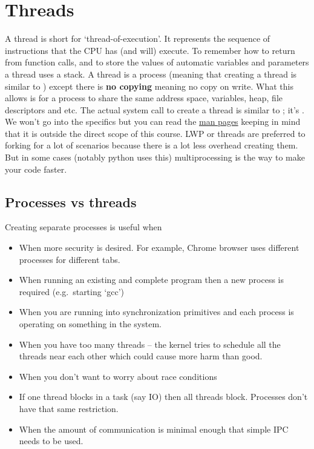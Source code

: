 \chapter{Threads}


A thread is short for `thread-of-execution'. It represents the sequence of instructions that the CPU has (and will) execute. To remember how to return from function calls, and to store the values of automatic variables and parameters a thread uses a stack. A thread is a process (meaning that creating a thread is similar to ) except there is \textbf{no copying} meaning no copy on write. What this allows is for a process to share the same address space, variables, heap, file descriptors and etc. The actual system call to create a thread is similar to ; it's . We won't go into the specifics but you can read the \href{http://man7.org/linux/man-pages/man2/clone.2.html}{man pages} keeping in mind that it is outside the direct scope of this course. LWP or threads are preferred to forking for a lot of scenarios because there is a lot less overhead creating them. But in some cases (notably python uses this) multiprocessing is the way to make your code faster.

\section{Processes vs threads}

Creating separate processes is useful when
\begin{itemize}
\tightlist
\item When more security is desired. For example, Chrome browser uses different processes for different tabs.
\item When running an existing and complete program then a new process is required (e.g.~starting `gcc') 
\item When you are running into synchronization primitives and each process is operating on something in the system.
\item When you have too many threads -- the kernel tries to schedule all the threads near each other which could cause more harm than good.
\item When you don't want to worry about race conditions
\item If one thread blocks in a task (say IO) then all threads block. Processes don't have that same restriction.
\item When the amount of communication is minimal enough that simple IPC needs to be used.
\end{itemize}

